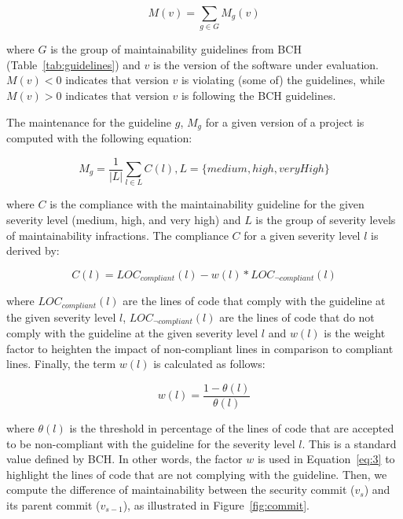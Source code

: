 \documentclass[sigconf,review]{acmart}
\begin{document}
\begin{equation}
    M(v) = \sum_{g \in G}^{} M_{g}(v)
\end{equation}

\noindent
where $G$ is the group of maintainability guidelines from BCH
(Table~\ref{tab:guidelines}) and $v$ is the version of the software under
evaluation. $M(v) < 0$ indicates that version $v$ is violating (some of) the
guidelines, while $M(v) > 0$ indicates that version $v$ is following
the BCH guidelines.

The maintenance for the guideline $g$, $M_g$ for a given version
of a project is computed with the following equation:

\begin{equation}
    M_{g} = \frac{1}{|L|} \sum_{l \in L}^{} C(l) , L = \{medium, high, veryHigh\}
\end{equation}

\noindent
where $C$ is the compliance with the maintainability guideline for the given
severity level (medium, high, and very high) and $L$ is the group of severity
levels of maintainability infractions. The compliance $C$ for a given severity
level $l$ is derived by:

\begin{equation}\label{eq:3}
    C(l) = LOC_{compliant}(l) - w(l) * LOC_{\neg compliant}(l)
\end{equation}

\noindent
where $LOC_{compliant}(l)$ are the lines of code that comply with the guideline
at the given severity level $l$, $LOC_{\neg compliant}(l)$ are the lines of code
that do not comply with the guideline at the given severity level $l$ and $w(l)$
is the weight factor to heighten the impact of non-compliant lines in comparison to
compliant lines. Finally, the term $w(l)$ is calculated as follows:

\begin{equation}
    w(l) = \frac{1 - \theta(l)}{\theta(l)}
\end{equation}

\noindent
where $\theta(l)$ is the threshold in percentage of the lines of code that are
accepted to be non-compliant with the guideline for the severity level $l$. This
is a standard value defined by BCH. In other words, the factor $w$ is used in
Equation~\ref{eq:3} to highlight the lines of code that are not complying with
the guideline. Then, we compute the difference of maintainability between the
security commit ($v_{s}$) and its parent commit ($v_{s-1}$), as illustrated in
Figure~\ref{fig:commit}.
\end{document}
